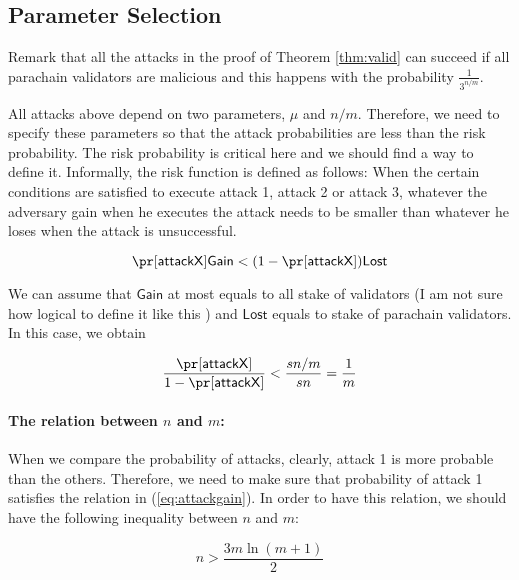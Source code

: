 
\subsection{Parameter Selection}

Remark that all the attacks in the proof of Theorem \ref{thm:valid} can succeed if all parachain validators are malicious and this happens with the probability $\frac{1}{3^{n/m}}$.


All attacks above depend on two parameters, $\mu$ and $n/m$. Therefore, we need to specify these parameters so that the attack probabilities are less than the risk probability. The risk probability is critical here and we should find a way to define it. Informally, the risk function is defined as follows: When the certain conditions are satisfied to execute attack 1, attack 2 or attack 3, whatever the adversary gain when he executes the attack needs to be smaller than whatever he loses when the attack is unsuccessful. 

\begin{equation}
    \pr[\mathsf{attack X}]\mathsf{Gain} < (1-\pr[\mathsf{attack X}])\mathsf{Lost}
\end{equation}

We can assume that $\mathsf{Gain}$ at most equals to all stake of validators (I am not sure how logical to define it like this ) and $\mathsf{Lost}$ equals to stake of parachain validators. In this case, we obtain

\begin{equation}\label{eq:attackgain}
    \frac{\pr[\mathsf{attack X}]}{1-\pr[\mathsf{attack X}]} < \frac{sn/m}{sn} = \frac{1}{m}
\end{equation}

\paragraph{The relation between $n$ and $m$:} When we compare the probability of attacks, clearly, attack 1 is more probable than the others. Therefore, we need to make sure that probability of attack 1 satisfies the relation in (\ref{eq:attackgain}). In order to have this relation, we should have the following inequality between $n$ and $m$:

\begin{equation}\label{eq:relation}
    n > \frac{3m\ln(m+1)}{2}
\end{equation}


